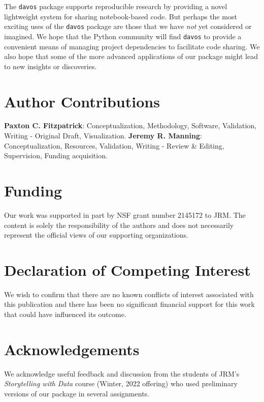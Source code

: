 \documentclass[preprint,12pt,a4paper]{elsarticle}
\begin{document}
The \texttt{davos} package supports reproducible research by providing
a novel lightweight system for sharing notebook-based code. But
perhaps the most exciting uses of the \texttt{davos} package are those
that we have \textit{not} yet considered or imagined. We hope that the
Python community will find \texttt{davos} to provide a convenient
means of managing project dependencies to facilitate code sharing. We
also hope that some of the more advanced applications of our package
might lead to new insights or discoveries.


\section*{Author Contributions}

\textbf{Paxton C. Fitzpatrick}: Conceptualization, Methodology,
Software, Validation, Writing - Original Draft,
Visualization. \textbf{Jeremy R. Manning}: Conceptualization,
Resources, Validation, Writing - Review \& Editing, Supervision,
Funding acquisition.

\section*{Funding}

Our work was supported in part by NSF grant number 2145172 to JRM.
The content is solely the responsibility of the authors and does not
necessarily represent the official views of our supporting
organizations.


\section*{Declaration of Competing Interest}

We wish to confirm that there are no known conflicts of interest
associated with this publication and there has been no significant
financial support for this work that could have influenced its
outcome.


\section*{Acknowledgements}

We acknowledge useful feedback and discussion from the students of
JRM's \textit{Storytelling with Data} course (Winter, 2022 offering)
who used preliminary versions of our package in several assignments.



\end{document}

